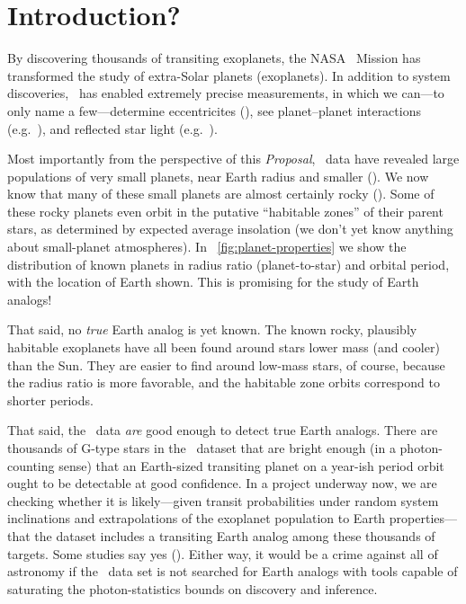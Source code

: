 \documentclass[letterpaper,12pt,preprint]{hack_aastex}
\newcommand{\documentname}{\textsl{Proposal}}
\begin{document}
\section{Introduction?}

By discovering thousands of transiting exoplanets, the NASA \Kepler\ Mission has
transformed the study of extra-Solar planets (exoplanets).
In addition to system discoveries, \Kepler\ has enabled
extremely precise measurements,
in which we can---to only name a few---determine eccentricites
(\citealt{photoecc}), see planet--planet interactions (e.g.~\citealt{carter}),
and reflected star light (e.g.~\citealt{demory}).

Most importantly from the perspective of this \documentname,
\Kepler\ data have revealed large populations of very small planets,
near Earth radius and smaller (\citealt{kois, petigura}).
We now know that many of these small planets are almost certainly rocky
(\citealt{lopez}).
Some of these rocky planets even orbit in the putative ``habitable zones'' of
their parent stars, as determined by expected average insolation
(we don't yet know anything about small-planet atmospheres).
In \figurename~\ref{fig:planet-properties} we show the distribution of known
planets in radius ratio (planet-to-star) and orbital period, with the location
of Earth shown.
This is promising for the study of Earth analogs!


That said, no \emph{true} Earth analog is yet known.
The known rocky, plausibly habitable exoplanets have all been found around
stars lower mass (and cooler) than the Sun.
They are easier to find around low-mass stars, of course,
because the radius ratio is more favorable, and the habitable zone orbits
correspond to shorter periods.

That said, the \Kepler\ data \emph{are} good enough to detect true Earth
analogs.
There are thousands of G-type stars in the \Kepler\ dataset
that are bright enough (in a photon-counting sense) that an Earth-sized
transiting planet on a year-ish period orbit ought to be detectable at good
confidence.
In a project underway now, we are checking whether it is likely---given transit
probabilities under random system inclinations and extrapolations of the
exoplanet population to Earth properties---that the dataset includes a
transiting Earth analog among these thousands of targets.
Some studies say yes (\citealt{petigura}).
Either way, it would be a crime against all of astronomy if the \Kepler\ data
set is not searched for Earth analogs with tools capable of saturating the
photon-statistics bounds on discovery and inference.
\end{document}
